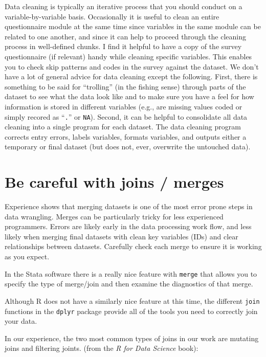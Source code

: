 \documentclass[]{book}
\begin{document}
Data cleaning is typically an iterative process that you should conduct on a variable-by-variable basis. Occasionally it is useful to clean an entire questionnaire module at the same time since variables in the same module can be related to one another, and since it can help to proceed through the cleaning process in well-defined chunks. I find it helpful to have a copy of the survey questionnaire (if relevant) handy while cleaning specific variables. This enables you to check skip patterns and codes in the survey against the dataset. We don't have a lot of general advice for data cleaning except the following. First, there is something to be said for ``trolling'' (in the fishing sense) through parts of the dataset to see what the data look like and to make sure you have a feel for how information is stored in different variables (e.g., are missing values coded or simply recored as ``\texttt{.}'' or \texttt{NA}). Second, it can be helpful to consolidate all data cleaning into a single program for each dataset. The data cleaning program corrects entry errors, labels variables, formats variables, and outputs either a temporary or final dataset (but does not, ever, overwrite the untouched data).

\hypertarget{be-careful-with-joins-merges}{%
\section{Be careful with joins / merges}\label{be-careful-with-joins-merges}}

Experience shows that merging datasets is one of the most error prone steps in data wrangling. Merges can be particularly tricky for less experienced programmers. Errors are likely early in the data processing work flow, and less likely when merging final datasets with clean key variables (IDs) and clear relationships between datasets. Carefully check each merge to ensure it is working as you expect.

In the Stata software there is a really nice feature with \texttt{merge} that allows you to specify the type of merge/join and then examine the diagnostics of that merge.

Although R does not have a similarly nice feature at this time, the different \texttt{join} functions in the \texttt{dplyr} package provide all of the tools you need to correctly join your data.

In our experience, the two most common types of joins in our work are mutating joins and filtering joints. (from the \emph{R for Data Science} book):
\end{document}
